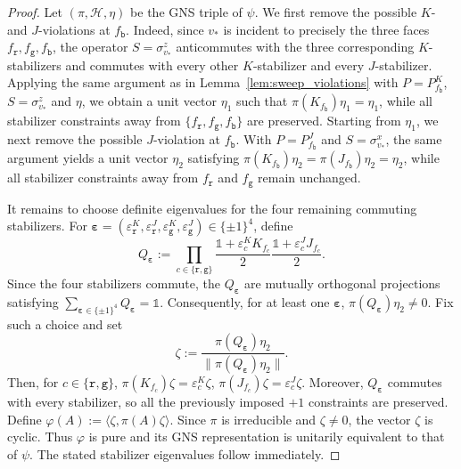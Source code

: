 \documentclass[a4paper,11pt]{article}
\theoremstyle{definition}
\theoremstyle{remark}
\theoremstyle{remark}
\begin{document}
\begin{proof}
    Let $(\pi,\mathcal H,\eta)$ be the GNS triple of $\psi$. We first remove the possible $K$- and $J$-violations at $f_{\mathtt b}$. Indeed, since $v_*$ is incident to precisely the three faces $f_{\mathtt r},f_{\mathtt g},f_{\mathtt b}$, the operator $S=\sigma_{v_*}^z$ anticommutes with the three corresponding $K$-stabilizers and commutes with every other $K$-stabilizer and every $J$-stabilizer. Applying the same argument as in Lemma~\ref{lem:sweep_violations} with $P=P_{f_{\mathtt b}}^K$, $S=\sigma^z_{v_*}$ and $\eta$, we obtain a unit vector $\eta_1$ such that $\pi(K_{f_{\mathtt b}})\eta_1=\eta_1$,  while all stabilizer constraints away from $\{f_{\mathtt r},f_{\mathtt g},f_{\mathtt b}\}$ are preserved. Starting from $\eta_1$, we next remove the possible $J$-violation at $f_{\mathtt b}$. With $P=P_{f_{\mathtt b}}^J$ and $S=\sigma_{v_*}^x$, the same argument yields a unit vector $\eta_2$ satisfying $\pi(K_{f_{\mathtt b}})\eta_2 = \pi(J_{f_{\mathtt b}})\eta_2 = \eta_2$,  while all stabilizer constraints away from $f_{\mathtt r}$ and $f_{\mathtt g}$ remain unchanged. 
    

    It remains to choose definite eigenvalues for the four remaining commuting stabilizers. For $\boldsymbol\varepsilon = (\varepsilon_{\mathtt r}^K,\varepsilon_{\mathtt r}^J,\varepsilon_{\mathtt g}^K,\varepsilon_{\mathtt g}^J)\in\{\pm1\}^4$, 
    define
    \[
        Q_{\boldsymbol\varepsilon} := \prod_{c\in\{\mathtt r,\mathtt g\}}\frac{\mathds{1}+\varepsilon_{c}^K K_{f_{c}}}{2}\frac{\mathds{1}+\varepsilon_{c}^J J_{f_{c}}}{2}.
    \]
    Since the four stabilizers commute, the $Q_{\boldsymbol\varepsilon}$ are mutually orthogonal projections satisfying $\sum_{\boldsymbol\varepsilon\in\{\pm1\}^4} Q_{\boldsymbol\varepsilon} = \mathds{1}$. Consequently, for at least one $\boldsymbol\varepsilon$, $\pi(Q_{\boldsymbol\varepsilon})\eta_2\neq0$. Fix such a choice and set
    \[
        \zeta := \frac{\pi(Q_{\boldsymbol\varepsilon})\eta_2}{\|\pi(Q_{\boldsymbol\varepsilon})\eta_2\|}.
    \]
    Then, for $c\in\{\mathtt r,\mathtt g\}$, $\pi(K_{f_{c}})\zeta = \varepsilon_{c}^K\zeta$, $\pi(J_{f_{c}})\zeta = \varepsilon_{c}^J\zeta$. Moreover, $Q_{\boldsymbol\varepsilon}$ commutes with every stabilizer, so all the previously imposed $+1$ constraints are preserved. Define $\varphi(A):=\langle\zeta,\pi(A)\zeta\rangle$. Since $\pi$ is irreducible and $\zeta\neq0$, the vector $\zeta$ is cyclic. Thus $\varphi$ is pure and its GNS representation is unitarily equivalent to that of $\psi$. The stated stabilizer eigenvalues follow immediately.
\end{proof}
\end{document}
